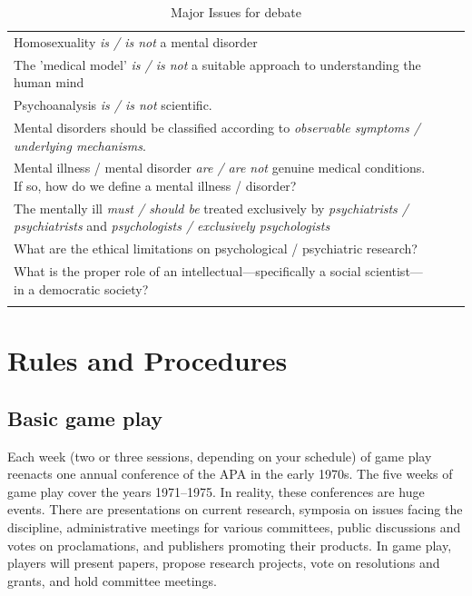  \begin{longtable}[!t]{ | P{7cm} | P{2cm} | P{1cm} | }
\hline

&&\\ \hline \hline
Homosexuality \emph{is / is not} a mental disorder& \\ \hline
The 'medical model' \emph{is / is not} a suitable approach to understanding the human mind& \\ \hline
Psychoanalysis \emph{is / is not} scientific.& \\ \hline
Mental disorders should be classified according to \emph{observable symptoms / underlying mechanisms}.& \\ \hline
Mental illness / mental disorder \emph{are / are not} genuine medical conditions. If so, how do we define a mental illness / disorder?& \\ \hline
The mentally ill \emph{must / should be} treated exclusively by \emph{psychiatrists / psychiatrists} and \emph{psychologists / exclusively psychologists} & \\ \hline
What are the ethical limitations on psychological / psychiatric research?& \\ \hline
What is the proper role of an intellectual---specifically a social scientist---in a democratic society?& \\ \hline
\caption{Major Issues for debate}
\label{table: majorissues}
\end{longtable}


\section{Rules and Procedures}
\label{rulesandprocedures}

\subsection{Basic game play}
\label{basicgameplay}

Each week (two or three sessions, depending on your schedule) of game play reenacts one annual conference of the APA in the early 1970s. The five weeks of game play cover the years 1971--1975. In reality, these conferences are huge events. There are presentations on current research, symposia on issues facing the discipline, administrative meetings for various committees, public discussions and votes on proclamations, and publishers promoting their products. In game play, players will present papers, propose research projects, vote on resolutions and grants, and hold committee meetings.

